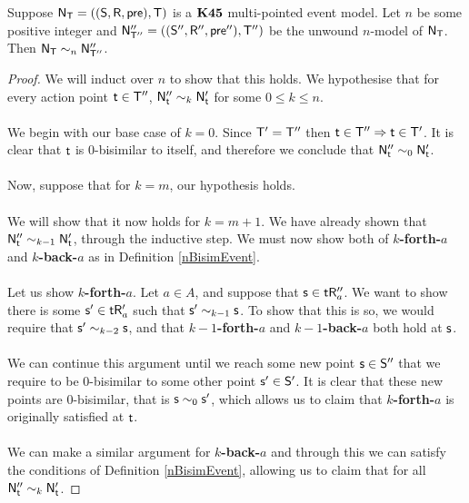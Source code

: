 \begin{lemma} \label{lemma:unwoundNModelNBisimilar}
  Suppose $\mathrm{\mathsf{N}}_\mathrm{\mathsf{T}} = ((\mathrm{\mathsf{S}},\mathrm{\mathsf{R}},\mathrm{\mathsf{pre}}),\mathrm{\mathsf{T}})$ is a $\bf K45$ multi-pointed
  event model.
  Let $n$ be some positive integer and $\mathrm{\mathsf{N}}''_{\mathrm{\mathsf{T}}''} = ((\mathrm{\mathsf{S}}'',\mathrm{\mathsf{R}}'',\mathrm{\mathsf{pre}}''),\mathrm{\mathsf{T}}'')$ be the
	unwound $n$-model of $\mathrm{\mathsf{N}}_\mathrm{\mathsf{T}}$.
  Then $\mathrm{\mathsf{N}}_\mathrm{\mathsf{T}} \sim_n \mathrm{\mathsf{N}}''_{\mathrm{\mathsf{T}}''}$.
\end{lemma}
\begin{proof}
	We will induct over $n$ to show that this holds.
	We hypothesise that for every action point $\mathrm{\mathsf{t}} \in \mathrm{\mathsf{T}}''$, $\mathrm{\mathsf{N}}''_\mathrm{\mathsf{t}} \sim_k \mathrm{\mathsf{N}}'_{\mathrm{\mathsf{t}}}$
	for some $0 \leq k \leq n$.\\
	\\
	We begin with our base case of $k = 0$.
	Since $\mathrm{\mathsf{T}}' = \mathrm{\mathsf{T}}''$ then $\mathrm{\mathsf{t}} \in \mathrm{\mathsf{T}}'' \Rightarrow \mathrm{\mathsf{t}} \in \mathrm{\mathsf{T}}'$.
	It is clear that $\mathrm{\mathsf{t}}$ is $0$-bisimilar to itself, and therefore we conclude that $\mathrm{\mathsf{N}}''_\mathrm{\mathsf{t}}
	\sim_0 \mathrm{\mathsf{N}}'_\mathrm{\mathsf{t}}$.\\
	\\
	Now, suppose that for $k = m$, our hypothesis holds.\\
	\\
	We will show that it now holds for $k = m+1$.
	We have already shown that $\mathrm{\mathsf{N}}''_\mathrm{\mathsf{t}} \sim_{k-1} \mathrm{\mathsf{N}}'_\mathrm{\mathsf{t}}$, through the inductive step.
	We must now show both of {\bf $k$-forth-$a$} and {\bf $k$-back-$a$} as in Definition
	\ref{nBisimEvent}.\\
	\\
	Let us show {\bf $k$-forth-$a$}.
	Let $a \in A$, and suppose that $\mathrm{\mathsf{s}} \in \mathrm{\mathsf{t}} \mathrm{\mathsf{R}}''_a$.
	We want to show there is some $\mathrm{\mathsf{s}}' \in \mathrm{\mathsf{t}} \mathrm{\mathsf{R}}'_a$ such that $\mathrm{\mathsf{s}}' \sim_{k-1} \mathrm{\mathsf{s}}$.
	To show that this is so, we would require that $\mathrm{\mathsf{s}}' \sim_{k-2} \mathrm{\mathsf{s}}$, and that {\bf
	$k-1$-forth-$a$} and {\bf $k-1$-back-$a$} both hold at $\mathrm{\mathsf{s}}$.\\
	\\
	We can continue this argument until we reach some new point $\mathrm{\mathsf{s}} \in \mathrm{\mathsf{S}}''$ that we require to be
	$0$-bisimilar to some other point $\mathrm{\mathsf{s}}' \in \mathrm{\mathsf{S}}'$.
	It is clear that these new points are 0-bisimilar, that is $\mathrm{\mathsf{s}} \sim_0 \mathrm{\mathsf{s}}'$, which allows us to
	claim that {\bf $k$-forth-$a$} is originally satisfied at $\mathrm{\mathsf{t}}$.\\
	\\
	We can make a similar argument for {\bf $k$-back-$a$} and through this we can satisfy the
	conditions of Definition \ref{nBisimEvent}, allowing us to claim that for all $\mathrm{\mathsf{N}}''_\mathrm{\mathsf{t}} \sim_k
	\mathrm{\mathsf{N}}'_{\mathrm{\mathsf{t}}}$.
\end{proof}

